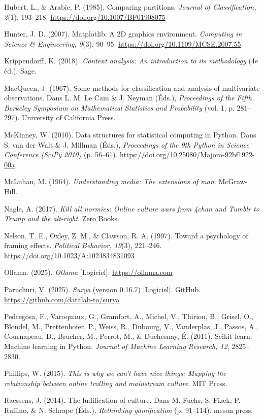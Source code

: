 \documentclass[11pt,a4paper]{article}
\begin{document}
Hubert, L., \& Arabie, P. (1985). Comparing partitions. \emph{Journal of Classification, 2}(1), 193--218. \url{https://doi.org/10.1007/BF01908075}

Hunter, J. D. (2007). Matplotlib: A 2D graphics environment. \emph{Computing in Science \& Engineering, 9}(3), 90--95. \url{https://doi.org/10.1109/MCSE.2007.55}

Krippendorff, K. (2018). \emph{Content analysis: An introduction to its methodology} (4e éd.). Sage.

MacQueen, J. (1967). Some methods for classification and analysis of multivariate observations. Dans L. M. Le Cam \& J. Neyman (Éds.), \emph{Proceedings of the Fifth Berkeley Symposium on Mathematical Statistics and Probability} (vol. 1, p. 281--297). University of California Press.

McKinney, W. (2010). Data structures for statistical computing in Python. Dans S. van der Walt \& J. Millman (Éds.), \emph{Proceedings of the 9th Python in Science Conference (SciPy 2010)} (p. 56--61). \url{https://doi.org/10.25080/Majora-92bf1922-00a}

McLuhan, M. (1964). \emph{Understanding media: The extensions of man}. McGraw-Hill.

Nagle, A. (2017). \emph{Kill all normies: Online culture wars from 4chan and Tumblr to Trump and the alt-right}. Zero Books.

Nelson, T. E., Oxley, Z. M., \& Clawson, R. A. (1997). Toward a psychology of framing effects. \emph{Political Behavior, 19}(3), 221--246. \url{https://doi.org/10.1023/A:1024834831093}

Ollama. (2025). \emph{Ollama} [Logiciel]. \url{https://ollama.com}

Paruchuri, V. (2025). \emph{Surya} (version 0.16.7) [Logiciel]. GitHub. \url{https://github.com/datalab-to/surya}

Pedregosa, F., Varoquaux, G., Gramfort, A., Michel, V., Thirion, B., Grisel, O., Blondel, M., Prettenhofer, P., Weiss, R., Dubourg, V., Vanderplas, J., Passos, A., Cournapeau, D., Brucher, M., Perrot, M., \& Duchesnay, É. (2011). Scikit-learn: Machine learning in Python. \emph{Journal of Machine Learning Research, 12}, 2825--2830.

Phillips, W. (2015). \emph{This is why we can't have nice things: Mapping the relationship between online trolling and mainstream culture}. MIT Press.

Raessens, J. (2014). The ludification of culture. Dans M. Fuchs, S. Fizek, P. Ruffino, \& N. Schrape (Éds.), \emph{Rethinking gamification} (p. 91--114). meson press.
\end{document}
